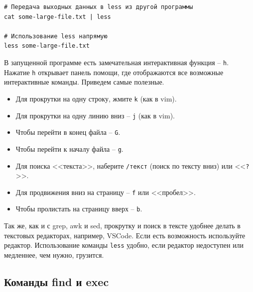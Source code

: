 \documentclass[a4paper,12pt,final,openany]{extbook}
\providecommand{\tightlist}{%
  \setlength{\itemsep}{0pt}\setlength{\parskip}{0pt}}
\begin{document}
\begin{verbatim}
# Передача выходных данных в less из другой программы
cat some-large-file.txt | less

# Использование less напрямую
less some-large-file.txt
\end{verbatim}

В запущенной программе есть замечательная интерактивная функция -- \texttt{h}. Нажатие
\texttt{h} открывает панель помощи, где отображаются все возможные
интерактивные команды. Приведем самые полезные.

\begin{itemize}
\tightlist
\item
  Для прокрутки на одну строку, жмите \texttt{k} (как в vim).
\item
  Для прокрутки на одну линию вниз -- \texttt{j} (как в vim).
\item
  Чтобы перейти в конец файла -- \texttt{G}.
\item
  Чтобы перейти к началу файла -- \texttt{g}.
\item
  Для поиска <<текста>>, наберите \texttt{/текст} (поиск по тексту вниз)
  или <<\texttt{?}>>.
\item
  Для продвижения вниз на страницу -- \texttt{f} или <<пробел>>.
\item
  Чтобы пролистать на страницу вверх -- \texttt{b}.
\end{itemize}

Так же, как и с grep, awk и sed, прокрутку и поиск в тексте удобнее делать в текстовых редакторах, например, VSCode. Если есть возможность
используйте редактор. Использование команды \texttt{less} удобно, если
редактор недоступен или медленнее, чем нужно, грузится.

\hypertarget{find-and-exec}{%
\subsection{\texorpdfstring{\protect\hyperlink{find-and-exec}{}Команды
find и exec}{Команды find и exec}}\label{find-and-exec}}
\end{document}
